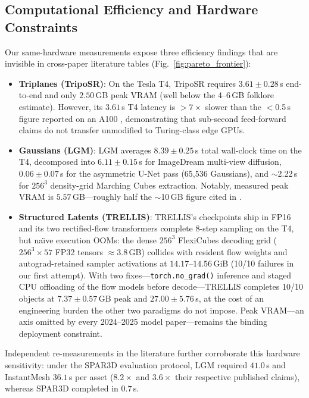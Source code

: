 \documentclass[10pt, conference]{IEEEtran}
\begin{document}
\subsection{Computational Efficiency and Hardware Constraints}
Our same-hardware measurements expose three efficiency findings that are invisible in cross-paper literature tables (Fig.~\ref{fig:pareto_frontier}):
\begin{itemize}
\item \textbf{Triplanes (TripoSR)}: On the Tesla T4, TripoSR requires $3.61 \pm 0.28$\,s end-to-end and only $2.50$\,GB peak VRAM (well below the 4--6\,GB folklore estimate). However, its $3.61$\,s T4 latency is $>7\times$ slower than the $<$0.5\,s figure reported on an A100 \cite{triposr2024}, demonstrating that sub-second feed-forward claims do not transfer unmodified to Turing-class edge GPUs.
\item \textbf{Gaussians (LGM)}: LGM averages $8.39 \pm 0.25$\,s total wall-clock time on the T4, decomposed into $6.11 \pm 0.15$\,s for ImageDream multi-view diffusion, $0.06 \pm 0.07$\,s for the asymmetric U-Net pass (65{,}536 Gaussians), and $\sim$2.22\,s for $256^3$ density-grid Marching Cubes extraction. Notably, measured peak VRAM is $5.57$\,GB---roughly half the $\sim$10\,GB figure cited in \cite{lgm2024}.
\item \textbf{Structured Latents (TRELLIS)}: TRELLIS's checkpoints ship in FP16 and its two rectified-flow transformers complete 8-step sampling on the T4, but na\"{\i}ve execution OOMs: the dense $256^3$ FlexiCubes decoding grid ($256^3 \times 57$ FP32 tensors $\approx 3.8$\,GB) collides with resident flow weights and autograd-retained sampler activations at $14.17$--$14.56$\,GiB (10/10 failures in our first attempt). With two fixes---\texttt{torch.no\_grad()} inference and staged CPU offloading of the flow models before decode---TRELLIS completes 10/10 objects at $7.37 \pm 0.57$\,GB peak and $27.00 \pm 5.76$\,s, at the cost of an engineering burden the other two paradigms do not impose. Peak VRAM---an axis omitted by every 2024--2025 model paper---remains the binding deployment constraint.
\end{itemize}

Independent re-measurements in the literature further corroborate this hardware sensitivity: under the SPAR3D \cite{spar3d2025} evaluation protocol, LGM required $41.0$\,s and InstantMesh $36.1$\,s per asset ($8.2\times$ and $3.6\times$ their respective published claims), whereas SPAR3D completed in $0.7$\,s.
\end{document}

